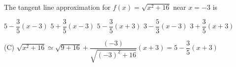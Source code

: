 \question
The tangent line approximation for $f(x)=\sqrt{x^{2}+16}$ near $x=-3$ is
\begin{choices}
  \choice $5-\dfrac{3}{5}(x-3)$
  \choice $5+\dfrac{3}{5}(x-3)$
  \CorrectChoice $5-\dfrac{3}{5}(x+3)$
  \choice $3-\dfrac{5}{3}(x-3)$
  \choice $3+\dfrac{3}{5}(x+3)$
\end{choices}
\begin{solution}
(C) $\sqrt{x^{2}+16} \simeq \sqrt{9+16}+\dfrac{(-3)}{\sqrt{(-3)^{2}+16}}(x+3)=5-\dfrac{3}{5}(x+3)$
\end{solution}
